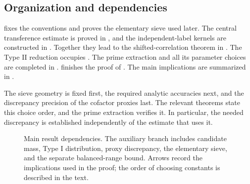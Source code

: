 \subsection{Organization and dependencies}

 fixes the conventions and proves the
elementary sieve used later. The central transference estimate is
proved in , and the independent-label kernels
are constructed in . Together they lead to the
shifted-correlation theorem in . The Type II
reduction occupies . The prime extraction and all
its parameter choices are completed in .
 finishes the proof of .
The main implications are summarized in .

The sieve geometry is fixed first, the required analytic accuracies
next, and the discrepancy precision of the cofactor proxies last.
The relevant theorems state this choice order, and the prime extraction
verifies it. In particular, the needed discrepancy is established
independently of the estimate that uses it.

\begin{figure}[!ht]
\centering
{}
\caption{Main result dependencies. The auxiliary branch includes
candidate mass, Type I distribution, proxy discrepancy, the elementary
sieve, and the separate balanced-range bound. Arrows record the implications used
in the proof; the order of choosing constants is described in the text.}
\label{fig:proof-dependencies}
\end{figure}

